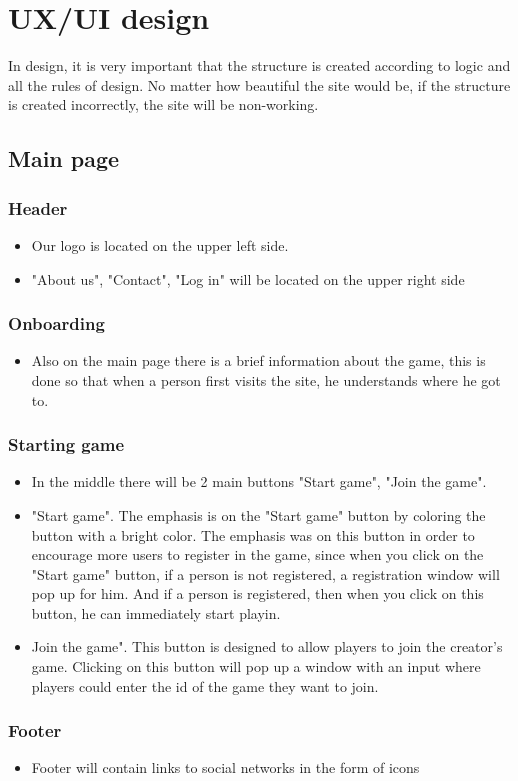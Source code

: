 \section{UX/UI design}
In design, it is very important that the structure is created according to logic and all the rules of design. No matter how beautiful the site would be, if the structure is created incorrectly, the site will be non-working.

	\subsection{Main page}
		\subsubsection{Header}
		\begin{itemize}
			\item Our logo is located on the upper left side.
			\item "About us", "Contact", "Log in" will be located on the upper right side
		\end{itemize}
		\subsubsection{Onboarding}
		\begin{itemize}
			\item Also on the main page there is a brief information about the game, this is done so that when a person first visits the site, he understands where he got to.
		\end{itemize}
		\subsubsection{Starting game}
		\begin{itemize}
			\item In the middle there will be 2 main buttons "Start game", "Join the game".
			\item "Start game". The emphasis is on the "Start game" button by coloring the button with a bright color. The emphasis was on this button in order to encourage more users to register in the game, since when you click on the "Start game" button, if a person is not registered, a registration window will pop up for him. And if a person is registered, then when you click on this button, he can immediately start playin.
			\item Join the game". This button is designed to allow players to join the creator's game. Clicking on this button will pop up a window with an input where players could enter the id of the game they want to join.
		\end{itemize}
		\subsubsection{Footer}
		\begin{itemize}
			\item Footer will contain links to social networks in the form of icons
		\end{itemize}
